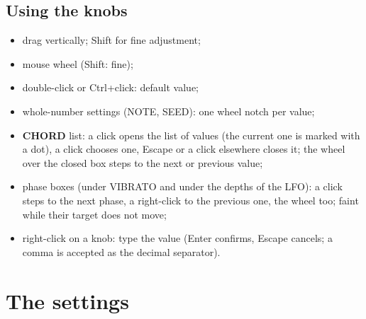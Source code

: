 \documentclass[a4paper,11pt]{article}
\newcommand{\ctl}[1]{\textsf{\textbf{#1}}}   %
\begin{document}
\subsection{Using the knobs}
\begin{itemize}
\item drag vertically; \textsf{Shift} for fine adjustment;
\item mouse wheel (\textsf{Shift}: fine);
\item double-click or \textsf{Ctrl}+click: default value;
\item whole-number settings (NOTE, SEED): one wheel notch per value;
\item \ctl{CHORD} list: a click opens the list of values (the current one is
  marked with a dot), a click chooses one, \textsf{Escape} or a click elsewhere closes it; the
  wheel over the closed box steps to the next or previous value;
\item phase boxes (under VIBRATO and under the depths of the LFO): a click steps to the next phase,
  a right-click to the previous one, the wheel too; faint while their target does not move;
\item right-click on a knob: type the value (\textsf{Enter} confirms, \textsf{Escape} cancels; a comma is
  accepted as the decimal separator).
\end{itemize}

\section{The settings}
\end{document}
